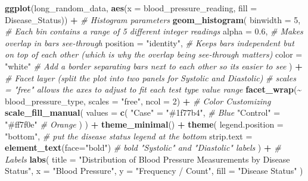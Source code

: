 \documentclass[
]{article}
\newenvironment{Shaded}{\begin{snugshade}}{\end{snugshade}}
\newcommand{\AttributeTok}[1]{\textcolor[rgb]{0.13,0.29,0.53}{#1}}
\newcommand{\CommentTok}[1]{\textcolor[rgb]{0.56,0.35,0.01}{\textit{#1}}}
\newcommand{\DecValTok}[1]{\textcolor[rgb]{0.00,0.00,0.81}{#1}}
\newcommand{\FloatTok}[1]{\textcolor[rgb]{0.00,0.00,0.81}{#1}}
\newcommand{\FunctionTok}[1]{\textcolor[rgb]{0.13,0.29,0.53}{\textbf{#1}}}
\newcommand{\NormalTok}[1]{#1}
\newcommand{\OtherTok}[1]{\textcolor[rgb]{0.56,0.35,0.01}{#1}}
\newcommand{\SpecialCharTok}[1]{\textcolor[rgb]{0.81,0.36,0.00}{\textbf{#1}}}
\newcommand{\StringTok}[1]{\textcolor[rgb]{0.31,0.60,0.02}{#1}}
\begin{document}
\begin{Shaded}
\begin{Highlighting}[]
\FunctionTok{ggplot}\NormalTok{(long\_random\_data, }\FunctionTok{aes}\NormalTok{(}\AttributeTok{x =}\NormalTok{ blood\_pressure\_reading, }\AttributeTok{fill =}\NormalTok{ Disease\_Status)) }\SpecialCharTok{+}
  \CommentTok{\# Histogram parameters}
  \FunctionTok{geom\_histogram}\NormalTok{(}
    \AttributeTok{binwidth =} \DecValTok{5}\NormalTok{,           }\CommentTok{\# Each bin contains a range of 5 different integer readings}
    \AttributeTok{alpha =} \FloatTok{0.6}\NormalTok{,            }\CommentTok{\# Makes overlap in bars see{-}through}
    \AttributeTok{position =} \StringTok{"identity"}\NormalTok{,  }\CommentTok{\# Keeps bars independent but on top of each other (which is why the overlap being see{-}through matters)}
    \AttributeTok{color =} \StringTok{"white"}         \CommentTok{\# Add a border separating bars next to each other so it\textquotesingle{}s easier to see}
\NormalTok{  ) }\SpecialCharTok{+}
  \CommentTok{\# Facet layer (split the plot into two panels for Systolic and Diastolic)}
  \CommentTok{\# scales = "free" allows the axes to adjust to fit each test type value range}
  \FunctionTok{facet\_wrap}\NormalTok{(}\SpecialCharTok{\textasciitilde{}}\NormalTok{ blood\_pressure\_type, }\AttributeTok{scales =} \StringTok{"free"}\NormalTok{, }\AttributeTok{ncol =} \DecValTok{2}\NormalTok{) }\SpecialCharTok{+}
  \CommentTok{\# Color Customizing}
  \FunctionTok{scale\_fill\_manual}\NormalTok{(}
    \AttributeTok{values =} \FunctionTok{c}\NormalTok{(}
      \StringTok{"Case"}      \OtherTok{=} \StringTok{"\#1f77b4"}\NormalTok{, }\CommentTok{\# Blue}
      \StringTok{"Control"}  \OtherTok{=} \StringTok{"\#ff7f0e"}  \CommentTok{\# Orange}
\NormalTok{    )}
\NormalTok{  ) }\SpecialCharTok{+}
  \FunctionTok{theme\_minimal}\NormalTok{() }\SpecialCharTok{+}
  \FunctionTok{theme}\NormalTok{(}
    \AttributeTok{legend.position =} \StringTok{"bottom"}\NormalTok{,          }\CommentTok{\# put the disease status legend at the bottom}
    \AttributeTok{strip.text =} \FunctionTok{element\_text}\NormalTok{(}\AttributeTok{face=}\StringTok{"bold"}\NormalTok{) }\CommentTok{\# bold "Systolic" and "Diastolic" labels}
\NormalTok{  ) }\SpecialCharTok{+}
  \CommentTok{\# Labels}
  \FunctionTok{labs}\NormalTok{(}
    \AttributeTok{title =} \StringTok{"Distribution of Blood Pressure Measurements by Disease Status"}\NormalTok{,}
    \AttributeTok{x =} \StringTok{"Blood Pressure"}\NormalTok{,}
    \AttributeTok{y =} \StringTok{"Frequency / Count"}\NormalTok{,}
    \AttributeTok{fill =} \StringTok{"Disease Status"}
\NormalTok{  )}
\end{Highlighting}
\end{Shaded}
\end{document}
